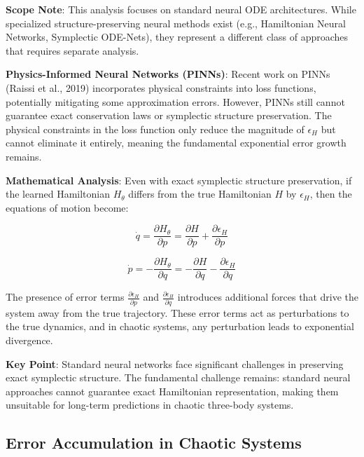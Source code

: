 \documentclass[11pt,a4paper]{article}
\begin{document}
\textbf{Scope Note}: This analysis focuses on standard neural ODE architectures. While specialized structure-preserving neural methods exist (e.g., Hamiltonian Neural Networks, Symplectic ODE-Nets), they represent a different class of approaches that requires separate analysis.

\textbf{Physics-Informed Neural Networks (PINNs)}: Recent work on PINNs (Raissi et al., 2019) incorporates physical constraints into loss functions, potentially mitigating some approximation errors. However, PINNs still cannot guarantee exact conservation laws or symplectic structure preservation. The physical constraints in the loss function only reduce the magnitude of $\epsilon_H$ but cannot eliminate it entirely, meaning the fundamental exponential error growth remains.

\textbf{Mathematical Analysis}: Even with exact symplectic structure preservation, if the learned Hamiltonian $H_\theta$ differs from the true Hamiltonian $H$ by $\epsilon_H$, then the equations of motion become:

\begin{equation}
\dot{q} = \frac{\partial H_\theta}{\partial p} = \frac{\partial H}{\partial p} + \frac{\partial \epsilon_H}{\partial p}
\end{equation}

\begin{equation}
\dot{p} = -\frac{\partial H_\theta}{\partial q} = -\frac{\partial H}{\partial q} - \frac{\partial \epsilon_H}{\partial q}
\end{equation}

The presence of error terms $\frac{\partial \epsilon_H}{\partial p}$ and $\frac{\partial \epsilon_H}{\partial q}$ introduces additional forces that drive the system away from the true trajectory. These error terms act as perturbations to the true dynamics, and in chaotic systems, any perturbation leads to exponential divergence.

\textbf{Key Point}: Standard neural networks face significant challenges in preserving exact symplectic structure. The fundamental challenge remains: standard neural approaches cannot guarantee exact Hamiltonian representation, making them unsuitable for long-term predictions in chaotic three-body systems.

\subsection{Error Accumulation in Chaotic Systems}
\end{document}
